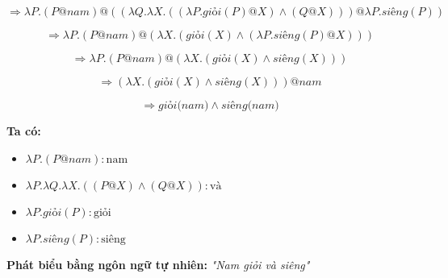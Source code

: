 \documentclass[a4paper, 15pt]{article}
\begin{document}
\[
\Rightarrow
\lambda P . (P @ \textit{nam}) @ \left( \left( \lambda Q . \lambda X . \left( (\lambda P . \textit{giỏi}(P) @ X) \land (Q @ X) \right) \right) @ \lambda P . \textit{siêng}(P) \right)
\]

\[
\Rightarrow
\lambda P . (P @ \textit{nam}) @ \left( \lambda X . \left( \textit{giỏi}(X) \land (\lambda P . \textit{siêng}(P) @ X) \right) \right)
\]

\[
\Rightarrow
\lambda P . (P @ \textit{nam}) @ \left( \lambda X . \left( \textit{giỏi}(X) \land \textit{siêng}(X) \right) \right)
\]

\[
\Rightarrow
\left( \lambda X . \left( \textit{giỏi}(X) \land \textit{siêng}(X) \right) \right) @ \textit{nam}
\]

\[
\Rightarrow
\textit{giỏi(nam)} \land \textit{siêng(nam)}
\]

\textbf{Ta có:}

\begin{itemize}
    \item $\lambda P. (P @ \textit{nam}) : \text{nam}$
    \item $\lambda P . \lambda Q . \lambda X . \left( (P @ X) \land (Q @ X) \right) : \text{và}$
    \item $\lambda P. \textit{giỏi} (P) : \text{giỏi}$
    \item $\lambda P. \textit{siêng} (P) : \text{siêng}$
\end{itemize}

\textbf{Phát biểu bằng ngôn ngữ tự nhiên: }
\textit{"Nam giỏi và siêng"}

\vspace{10pt}
\end{document}
